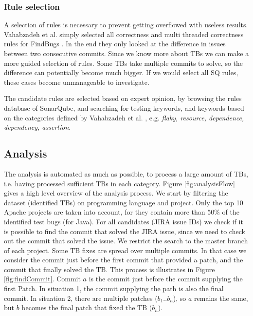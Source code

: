 \documentclass{uvamscse}
\newcommand{\Atestbugs}{Vahabzadeh et al.}
\begin{document}
\subsubsection{Rule selection}
A selection of rules is necessary to prevent getting overflowed with useless results. \Atestbugs{} simply selected all correctness and multi threaded correctness rules for FindBugs \cite{vahabzadeh2015empirical}. In the end they only looked at the difference in issues between two consecutive commits. Since we know more about TBs we can make a more guided selection of rules. Some TBs take multiple commits to solve, so the difference can potentially become much bigger. If we would select all SQ rules, these cases become unmanageable to investigate.

The candidate rules are selected based on expert opinion, by browsing the rules database of SonarQube, and searching for testing keywords, and keywords based on the categories defined by \Atestbugs{} \cite{vahabzadeh2015empirical}, e.g. \emph{flaky, resource, dependence, dependency, assertion}. 

\subsection{Analysis}
\label{sec:TBanalysis}
The analysis is automated as much as possible, to process a large amount of TBs, i.e. having processed sufficient TBs in each category. Figure \ref{fig:analysisFlow} gives a high level overview of the analysis process. We start by filtering the dataset (identified TBs) on programming language and project. Only the top 10 Apache projects are taken into account, for they contain more than 50\% of the identified test bugs (for Java). For all candidates (JIRA issue IDs) we check if it is possible to find the commit that solved the JIRA issue, since we need to check out the commit that solved the issue. We restrict the search to the master branch of each project. Some TB fixes are spread over multiple commits. In that case we consider the commit just before the first commit that provided a patch, and the commit that finally solved the TB. This process is illustrates in Figure \ref{fig:findCommit}. Commit $a$ is the commit just before the commit supplying the first Patch. In situation 1, the commit supplying the path is also the final commit. In situation 2, there are multiple patches ($b_1 .. b_n$), so $a$ remains the same, but $b$ becomes the final patch that fixed the TB ($b_n$).
\end{document}
